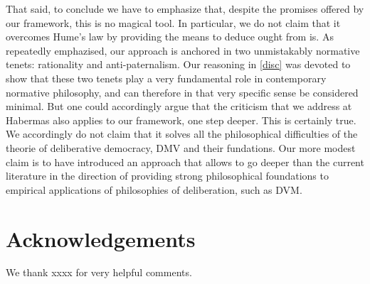 \documentclass[version=last, pagesize, twoside=off, bibliography=totoc, DIV=calc, fontsize=14pt, a4paper, french, english]{scrartcl}
\newenvironment{acknowledgements}{
	\section*{Acknowledgements}
}{
}
\begin{document}
That said, to conclude we have to emphasize that, despite the promises offered by our framework, this is no magical tool. In particular, we do not claim that it overcomes Hume's law by providing the means to deduce ought from is. As repeatedly emphazised, our approach is anchored in two unmistakably normative tenets: rationality and anti-paternalism. Our reasoning in \cref{disc} was devoted to show that these two tenets play a very fundamental role in contemporary normative philosophy, and can therefore in that very specific sense be considered minimal. But one could accordingly argue that the criticism that we address at Habermas also applies to our framework, one step deeper. This is certainly true. We accordingly do not claim that it solves all the philosophical difficulties of the theorie of deliberative democracy, DMV and their fundations. Our more modest claim is to have introduced an approach that allows to go deeper than the current literature in the direction of providing strong philosophical foundations to empirical applications of philosophies of deliberation, such as DVM. 


\begin{acknowledgements}
We thank xxxx for very helpful comments.
\end{acknowledgements}


\end{document}

